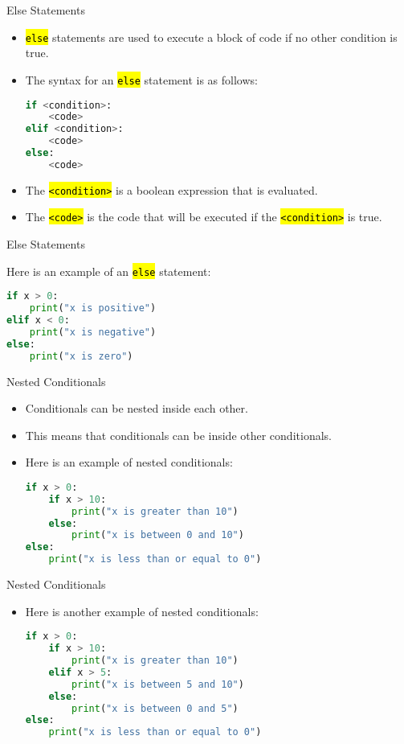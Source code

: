 \documentclass[
    aspectratio=169, 
    usepdftitle=false, 
    xcolor={dvipsnames},
    hyperref={
        colorlinks,
        linkcolor=black,
        urlcolor=blue}
    ]{beamer}
\let\OldTexttt\texttt
\renewcommand{\texttt}[1]{\OldTexttt{\hl{#1}}}%
\begin{document}
\begin{frame}[fragile]{Else Statements}
    \begin{itemize}
        \item \texttt{else} statements are used to execute a block of code if no other condition is true.
        \item The syntax for an \texttt{else} statement is as follows:
        \begin{lstlisting}[language=Python]
if <condition>:
    <code>
elif <condition>:
    <code>
else:
    <code>
        \end{lstlisting}
        \item The \texttt{<condition>} is a boolean expression that is evaluated.
        \item The \texttt{<code>} is the code that will be executed if the \texttt{<condition>} is true.
    \end{itemize}   
\end{frame}

\begin{frame}[fragile]{Else Statements}

   Here is an example of an \texttt{else} statement:
        \begin{lstlisting}[language=Python]
if x > 0:
    print("x is positive")
elif x < 0:
    print("x is negative")
else:
    print("x is zero")
        \end{lstlisting}
\end{frame}

\begin{frame}[fragile]{Nested Conditionals}
    \begin{itemize}
        \item Conditionals can be nested inside each other.
        \item This means that conditionals can be inside other conditionals.
        \item Here is an example of nested conditionals:
        \begin{lstlisting}[language=Python]
if x > 0:
    if x > 10:
        print("x is greater than 10")
    else:
        print("x is between 0 and 10")
else:
    print("x is less than or equal to 0")
        \end{lstlisting}
    \end{itemize}
\end{frame}

\begin{frame}[fragile]{Nested Conditionals}
    \begin{itemize}
        \item Here is another example of nested conditionals:
        \begin{lstlisting}[language=Python]
if x > 0:
    if x > 10:
        print("x is greater than 10")
    elif x > 5:
        print("x is between 5 and 10")
    else:
        print("x is between 0 and 5")
else:
    print("x is less than or equal to 0")
        \end{lstlisting}
    \end{itemize}
\end{frame}
\end{document}
